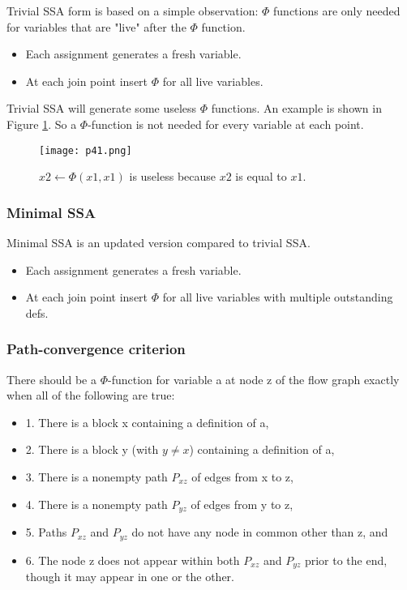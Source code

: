 Trivial SSA form is based on a simple observation: $\Phi$ functions are only needed for variables that are "live" after the $\Phi$ function.

\begin{itemize}
	\item Each assignment generates a fresh variable.
	\item At each join point insert $\Phi$ for all live variables.
\end{itemize}


Trivial SSA will generate some useless $\Phi$ functions. An example is shown in Figure \ref{fig:p41}. 
So a $\Phi$-function is not needed for every variable at each point.

\begin{figure}[H]
	\centering
	\texttt{[image: p41.png]}
	\caption{$x2 \leftarrow \Phi(x1,x1)$ is useless because $x2$ is equal to $x1$.}
	\label{fig:p41}

\end{figure}



\subsubsection{Minimal SSA}
Minimal SSA is an updated version compared to trivial SSA.

\begin{itemize}
	\item Each assignment generates a fresh variable.
	\item At each join point insert $\Phi$ for all live variables with multiple outstanding defs.
\end{itemize}

\subsubsection{Path-convergence criterion}

There should be a $\Phi$-function for variable a at node z of the flow graph
exactly when all of the following are true:

\begin{itemize}
	\item 1. There is a block x containing a definition of a,
	\item 2. There is a block y (with $y \neq x$) containing a definition of a,
	\item 3. There is a nonempty path $P_{xz}$ of edges from x to z,
	\item 4. There is a nonempty path $P_{yz}$ of edges from y to z,
	\item 5. Paths $P_{xz}$ and $P_{yz}$ do not have any node in common other than z, and
	\item 6. The node z does not appear within both $P_{xz}$ and $P_{yz}$ prior to the
	      end, though it may appear in one or the other.
\end{itemize}


